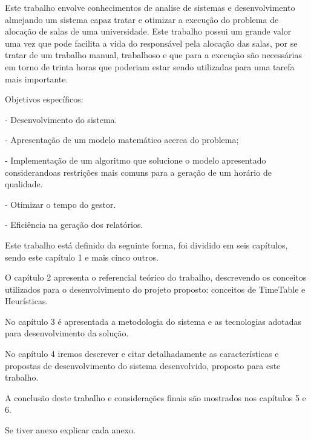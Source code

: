 	Este trabalho envolve conhecimentos de analise de sistemas e desenvolvimento almejando um sistema capaz tratar e otimizar a execução do problema de alocação de salas de uma universidade. Este trabalho possui um grande valor uma vez que pode facilita a vida do responsável pela alocação das salas, por se tratar de um trabalho manual, trabalhoso e que para a execução são necessárias em torno de trinta horas que poderiam estar sendo utilizadas para uma tarefa mais importante.\par


	Objetivos específicos:\par

	- Desenvolvimento do sistema.\par

	- Apresentação de um modelo matemático acerca do problema;

	- Implementação de um algoritmo que solucione o modelo apresentado considerandoas restrições mais comuns para a geração de um horário de qualidade.

	- Otimizar o tempo do gestor.\par

	- Eficiência na geração dos relatórios.\par



Este trabalho está definido da seguinte forma, foi dividido em seis capítulos, sendo este capítulo 1 e mais cinco outros.\par

O capítulo 2 apresenta o referencial teórico do trabalho, descrevendo os conceitos utilizados para o desenvolvimento do projeto proposto: conceitos de TimeTable e Heurísticas.\par

No capítulo 3 é apresentada a metodologia do sistema e as tecnologias adotadas para desenvolvimento da solução.\par

No capítulo 4 iremos descrever e citar detalhadamente as características e propostas de desenvolvimento do sistema desenvolvido, proposto para este trabalho.\par

A conclusão deste trabalho e considerações finais são mostrados nos capítulos 5 e 6.\par

Se tiver anexo explicar cada anexo.
